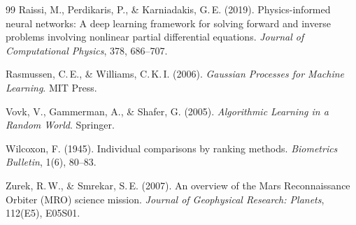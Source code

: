 \documentclass[11pt,a4paper]{article}
\begin{document}
\begin{thebibliography}{99}
Raissi, M., Perdikaris, P., \& Karniadakis, G.\,E. (2019). Physics-informed neural networks: A deep learning framework for solving forward and inverse problems involving nonlinear partial differential equations. \emph{Journal of Computational Physics}, 378, 686--707.

Rasmussen, C.\,E., \& Williams, C.\,K.\,I. (2006). \emph{Gaussian Processes for Machine Learning}. MIT Press.

Vovk, V., Gammerman, A., \& Shafer, G. (2005). \emph{Algorithmic Learning in a Random World}. Springer.

Wilcoxon, F. (1945). Individual comparisons by ranking methods. \emph{Biometrics Bulletin}, 1(6), 80--83.

Zurek, R.\,W., \& Smrekar, S.\,E. (2007). An overview of the Mars Reconnaissance Orbiter (MRO) science mission. \emph{Journal of Geophysical Research: Planets}, 112(E5), E05S01.

\end{thebibliography}

\appendix
\clearpage
\end{document}

